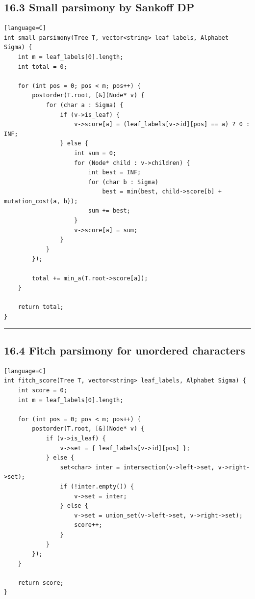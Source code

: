 \documentclass[11pt]{article}
\begin{document}
\subsection{16.3 Small parsimony by Sankoff DP}\label{small-parsimony-by-sankoff-dp}

\begin{verbatim}[language=C]
int small_parsimony(Tree T, vector<string> leaf_labels, Alphabet Sigma) {
    int m = leaf_labels[0].length;
    int total = 0;

    for (int pos = 0; pos < m; pos++) {
        postorder(T.root, [&](Node* v) {
            for (char a : Sigma) {
                if (v->is_leaf) {
                    v->score[a] = (leaf_labels[v->id][pos] == a) ? 0 : INF;
                } else {
                    int sum = 0;
                    for (Node* child : v->children) {
                        int best = INF;
                        for (char b : Sigma)
                            best = min(best, child->score[b] + mutation_cost(a, b));
                        sum += best;
                    }
                    v->score[a] = sum;
                }
            }
        });

        total += min_a(T.root->score[a]);
    }

    return total;
}
\end{verbatim}

\begin{center}\rule{0.5\linewidth}{0.5pt}\end{center}

\subsection{16.4 Fitch parsimony for unordered characters}\label{fitch-parsimony-for-unordered-characters}

\begin{verbatim}[language=C]
int fitch_score(Tree T, vector<string> leaf_labels, Alphabet Sigma) {
    int score = 0;
    int m = leaf_labels[0].length;

    for (int pos = 0; pos < m; pos++) {
        postorder(T.root, [&](Node* v) {
            if (v->is_leaf) {
                v->set = { leaf_labels[v->id][pos] };
            } else {
                set<char> inter = intersection(v->left->set, v->right->set);
                if (!inter.empty()) {
                    v->set = inter;
                } else {
                    v->set = union_set(v->left->set, v->right->set);
                    score++;
                }
            }
        });
    }

    return score;
}
\end{verbatim}
\end{document}
